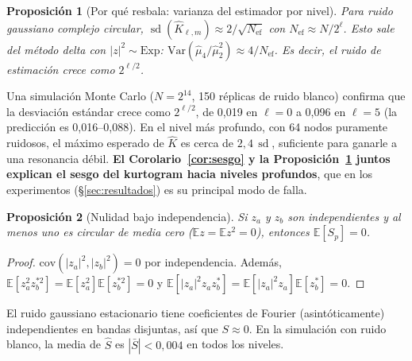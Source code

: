 \documentclass[11pt,a4paper]{article}
\newtheorem{proposicion}{Proposición}
\theoremstyle{definition}
\theoremstyle{remark}
\newcommand{\E}{\mathbb{E}}
\begin{document}
\begin{proposicion}[Por qué resbala: varianza del estimador por nivel]\label{prop:var}
Para ruido gaussiano complejo circular, $\operatorname{sd}(\hat K_{\ell,m})\approx 2/\sqrt{N_{\text{ef}}}$ con $N_{\text{ef}}\approx N/2^\ell$. Esto sale del método delta con $|z|^2\sim\mathrm{Exp}$: $\mathrm{Var}(\hat\mu_4/\hat\mu_2^2)\approx 4/N_{\text{ef}}$. Es decir, el ruido de estimación \emph{crece} como $2^{\ell/2}$.
\end{proposicion}
\noindent Una simulación Monte Carlo ($N=2^{14}$, 150 réplicas de ruido blanco) confirma que la desviación estándar crece como $2^{\ell/2}$, de 0{,}019 en $\ell=0$ a 0{,}096 en $\ell=5$ (la predicción es 0{,}016--0{,}088). En el nivel más profundo, con 64 nodos puramente ruidosos, el máximo esperado de $\hat K$ es cerca de $2{,}4\,\operatorname{sd}$, suficiente para ganarle a una resonancia débil. \textbf{El Corolario~\ref{cor:sesgo} y la Proposición~\ref{prop:var} juntos explican el sesgo del kurtogram hacia niveles profundos}, que en los experimentos (§\ref{sec:resultados}) es su principal modo de falla.

\begin{proposicion}[Nulidad bajo independencia]\label{prop:nula}
Si $z_a$ y $z_b$ son independientes y al menos uno es circular de media cero ($\E z=\E z^2=0$), entonces $\E[S_p]=0$.
\end{proposicion}
\begin{proof}
$\mathrm{cov}(|z_a|^2,|z_b|^2)=0$ por independencia. Además, $\E[z_a^2z_b^{*2}]=\E[z_a^2]\E[z_b^{*2}]=0$ y $\E[|z_a|^2z_az_b^*]=\E[|z_a|^2z_a]\E[z_b^*]=0$.
\end{proof}
\noindent El ruido gaussiano estacionario tiene coeficientes de Fourier (asintóticamente) independientes en bandas disjuntas, así que $S\approx0$. En la simulación con ruido blanco, la media de $\hat S$ es $|\bar S|<0{,}004$ en todos los niveles.
\end{document}
